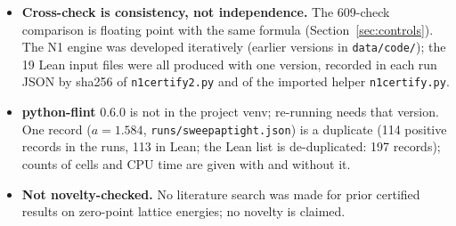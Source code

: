 \documentclass[10pt]{article}
\renewcommand{\_}{\textunderscore\penalty0\hspace{0pt}}
\begin{document}
\begin{itemize}
\item \textbf{Cross-check is consistency, not independence.} The 609-check comparison is floating point with the same formula (Section~\ref{sec:controls}). The N1 engine was developed iteratively (earlier versions in \texttt{data/code/}); the 19 Lean input files were all produced with one version, recorded in each run JSON by sha256 of \texttt{n1\_certify2.py} and of the imported helper \texttt{n1\_certify.py}.
\item \textbf{python-flint} 0.6.0 is not in the project venv; re-running needs that version. One record ($a=1.584$, \texttt{runs/sweep\_ap\_tight.json}) is a duplicate (114 positive records in the runs, 113 in Lean; the Lean list is de-duplicated: 197 records); counts of cells and CPU time are given with and without it.
\item \textbf{Not novelty-checked.} No literature search was made for prior certified results on zero-point lattice energies; no novelty is claimed.
\end{itemize}

\end{document}
